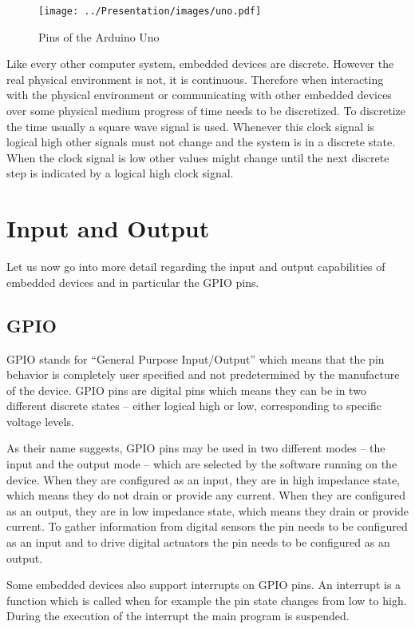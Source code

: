 \documentclass[pdftex,12pt,a4paper,fleqn]{scrartcl}
\begin{document}
\begin{figure}[H]	
	\centering
    \texttt{[image: ../Presentation/images/uno.pdf]}
    \caption{Pins of the Arduino Uno}
    \label{fig:arduino_uno}
\end{figure}

Like every other computer system, embedded devices are discrete. However the real physical environment is not, it is continuous. Therefore when interacting with the physical environment or communicating with other embedded devices over some physical medium progress of time needs to be discretized. To discretize the time usually a square wave signal is used. Whenever this clock signal is logical high other signals must not change and the system is in a discrete state. When the clock signal is low other values might change until the next discrete step is indicated by a logical high clock signal.


\section{Input and Output}
Let us now go into more detail regarding the input and output capabilities of embedded devices and in particular the GPIO pins.

\subsection{GPIO}
GPIO stands for \enquote{General Purpose Input/Output} which means that the pin behavior is completely user specified and not predetermined by the manufacture of the device. GPIO pins are digital pins which means they can be in two different discrete states -- either logical high or low, corresponding to specific voltage levels.

As their name suggests, GPIO pins may be used in two different modes -- the input and the output mode -- which are selected by the software running on the device. When they are configured as an input, they are in high impedance state, which means they do not drain or provide any current. When they are configured as an output, they are in low impedance state, which means they drain or provide current.  To gather information from digital sensors the pin needs to be configured as an input and to drive digital actuators the pin needs to be configured as an output.

Some embedded devices also support interrupts on GPIO pins. An interrupt is a function which is called when for example the pin state changes from low to high. During the execution of the interrupt the main program is suspended.
\end{document}
